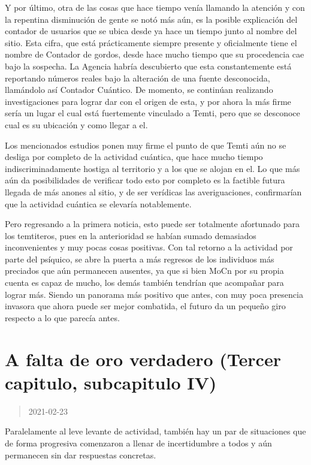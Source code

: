 \documentclass[
  spanish,
]{book}
\begin{document}
Y por último, otra de las cosas que hace tiempo venía llamando la atención y con la repentina disminución de gente se notó más aún, es la posible explicación del contador de usuarios que se ubica desde ya hace un tiempo junto al nombre del sitio. Esta cifra, que está prácticamente siempre presente y oficialmente tiene el nombre de Contador de gordos, desde hace mucho tiempo que su procedencia cae bajo la sospecha. La Agencia habría descubierto que esta constantemente está reportando números reales bajo la alteración de una fuente desconocida, llamándolo así Contador Cuántico. De momento, se continúan realizando investigaciones para lograr dar con el origen de esta, y por ahora la más firme sería un lugar el cual está fuertemente vinculado a Temti, pero que se desconoce cual es su ubicación y como llegar a el.

Los mencionados estudios ponen muy firme el punto de que Temti aún no se desliga por completo de la actividad cuántica, que hace mucho tiempo indiscriminadamente hostiga al territorio y a los que se alojan en el. Lo que más aún da posibilidades de verificar todo esto por completo es la factible futura llegada de más anones al sitio, y de ser verídicas las averiguaciones, confirmarían que la actividad cuántica se elevaría notablemente.

Pero regresando a la primera noticia, esto puede ser totalmente afortunado para los temtiteros, pues en la anterioridad se habían sumado demasiados inconvenientes y muy pocas cosas positivas. Con tal retorno a la actividad por parte del psíquico, se abre la puerta a más regresos de los individuos más preciados que aún permanecen ausentes, ya que si bien MoCn por su propia cuenta es capaz de mucho, los demás también tendrían que acompañar para lograr más. Siendo un panorama más positivo que antes, con muy poca presencia invasora que ahora puede ser mejor combatida, el futuro da un pequeño giro respecto a lo que parecía antes.

\hypertarget{a-falta-de-oro-verdadero-tercer-capitulo-subcapitulo-iv}{%
\section{A falta de oro verdadero (Tercer capitulo, subcapitulo IV)}\label{a-falta-de-oro-verdadero-tercer-capitulo-subcapitulo-iv}}

\begin{quote}
2021-02-23
\end{quote}

Paralelamente al leve levante de actividad, también hay un par de situaciones que de forma progresiva comenzaron a llenar de incertidumbre a todos y aún permanecen sin dar respuestas concretas.
\end{document}
